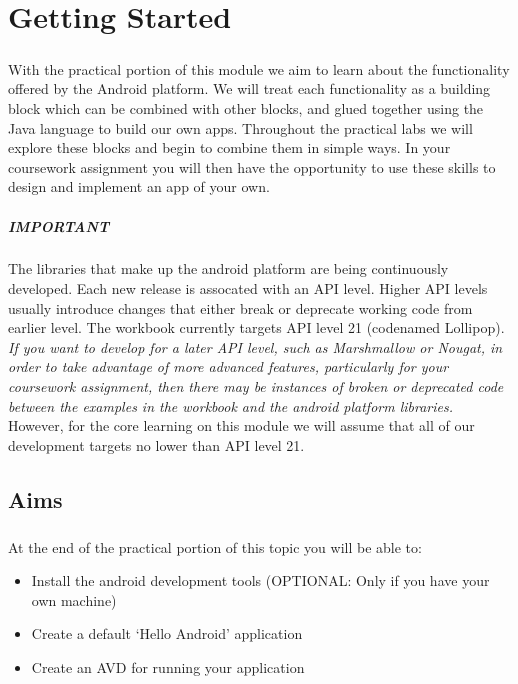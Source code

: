 \chapter{Getting Started}
\label{lab1}
\paragraph{} With the practical portion of this module we aim to learn about the functionality offered by the Android platform. We will treat each functionality as a building block which can be combined with other blocks, and glued together using the Java language to build our own apps. Throughout the practical labs we will explore these blocks and begin to combine them in simple ways. In your coursework assignment you will then have the opportunity to use these skills to design and implement an app of your own.

\begin{framed}
\paragraph{IMPORTANT} The libraries that make up the android platform are being continuously developed. Each new release is assocated with an API level. Higher API levels usually introduce changes that either break or deprecate working code from earlier level. The workbook currently targets API level 21 (codenamed Lollipop). \emph{If you want to develop for a later API level, such as Marshmallow or Nougat, in order to take advantage of more advanced features, particularly for your coursework assignment, then there may be instances of broken or deprecated code between the examples in the workbook and the android platform libraries.} However, for the core learning on this module we will assume that all of our development targets no lower than API level 21.
\end{framed}

\section{Aims}
\paragraph{} At the end of the practical portion of this topic you will be able to:

\begin{itemize}
\item Install the android development tools (OPTIONAL: Only if you have your own machine)
\item Create a default `Hello Android' application
\item Create an AVD for running your application
\end{itemize}

